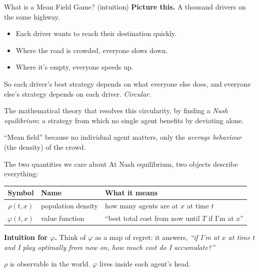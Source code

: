 \documentclass[10pt,aspectratio=169]{beamer}
\newcommand{\teal}[1]{\textcolor{kaustteal}{#1}}
\newcommand{\blue}[1]{\textcolor{kaustblue}{#1}}
\newcommand{\citehl}[1]{\textcolor{kaustblue!80!black}{\textbf{[#1]}}}
\begin{document}
\begin{frame}{What is a Mean Field Game? \;\textnormal{\small(intuition)}}
\textbf{Picture this.} A thousand drivers on the same highway.
\smallskip
\begin{itemize}\setlength\itemsep{1pt}
  \item Each driver wants to reach their destination quickly.
  \item Where the road is \alert{crowded}, everyone slows down.
  \item Where it's \teal{empty}, everyone speeds up.
\end{itemize}

\medskip
So each driver's best strategy depends on \alert{what everyone else does},
and everyone else's strategy depends on each driver. \emph{Circular.}

\medskip
\begin{idea}[title=Mean Field Game (\citehl{Lasry--Lions 2007}, \citehl{Huang--Caines--Malham\'e 2006})]
The mathematical theory that resolves this circularity, by finding a
\emph{Nash equilibrium}: a strategy from which no single agent benefits
by deviating alone.
\end{idea}

\medskip
\teal{``Mean field''} because no individual agent matters, only the
\emph{average behaviour} (the density) of the crowd.
\end{frame}

\begin{frame}{The two quantities we care about}
At Nash equilibrium, two objects describe everything:

\medskip
\begin{center}
\begin{tabular}{cll}
\toprule
Symbol & Name & What it means \\
\midrule
$\rho(t,x)$ & \blue{population density} & how many agents are at $x$ at time $t$ \\
$\varphi(t,x)$ & \blue{value function} & ``best total cost from now until $T$ if I'm at $x$'' \\
\bottomrule
\end{tabular}
\end{center}

\medskip
\textbf{Intuition for $\varphi$.}  Think of $\varphi$ as a
\teal{map of regret}: it answers, \emph{``if I'm at $x$ at time $t$ and
I play optimally from now on, how much cost do I accumulate?''}

\medskip
$\rho$ is observable in the world. $\varphi$ lives inside each agent's head.
\end{frame}
\end{document}
